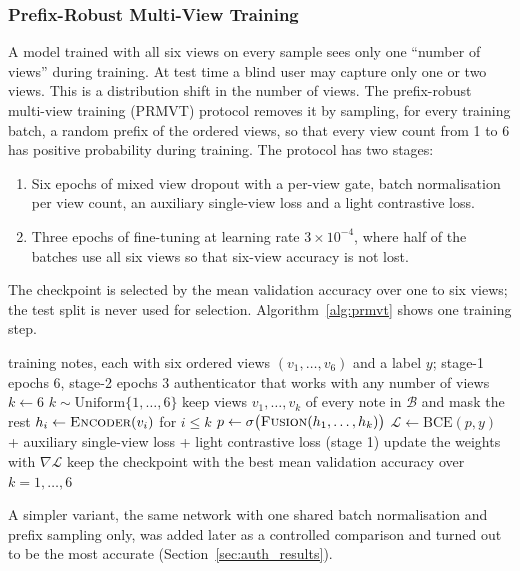 \subsubsection*{Prefix-Robust Multi-View Training}
A model trained with all six views on every sample sees only one ``number of views'' during training. At test time a blind user may capture only one or two views. This is a distribution shift in the number of views. The prefix-robust multi-view training (PRMVT) protocol removes it by sampling, for every training batch, a random prefix of the ordered views, so that every view count from 1 to 6 has positive probability during training. The protocol has two stages:
\begin{enumerate}[noitemsep]
    \item Six epochs of mixed view dropout with a per-view gate, batch normalisation per view count, an auxiliary single-view loss and a light contrastive loss.
    \item Three epochs of fine-tuning at learning rate $3\times10^{-4}$, where half of the batches use all six views so that six-view accuracy is not lost.
\end{enumerate}
The checkpoint is selected by the mean validation accuracy over one to six views; the test split is never used for selection. Algorithm~\ref{alg:prmvt} shows one training step.

\begin{algorithm}[!htbp]
\caption{Prefix-robust multi-view training (PRMVT)}
\label{alg:prmvt}
\begin{algorithmic}[1]
\Require training notes, each with six ordered views $(v_1,\dots,v_6)$ and a label $y$; stage-1 epochs $6$, stage-2 epochs $3$
\Ensure authenticator that works with any number of views
   \State $k \gets 6$
  \Else \State $k \sim \mathrm{Uniform}\{1,\dots,6\}$ 
  \EndIf
  \State keep views $v_1,\dots,v_k$ of every note in $\mathcal{B}$ and mask the rest
  \State $h_i \gets \textsc{Encoder}(v_i)$ for $i \le k$ 
  \State $p \gets \sigma\big(\textsc{Fusion}(h_1,\dots,h_k)\big)$ 
  \State $\mathcal{L} \gets \mathrm{BCE}(p, y)$ + auxiliary single-view loss + light contrastive loss (stage 1)
  \State update the weights with $\nabla \mathcal{L}$
\EndFor
\State keep the checkpoint with the best mean validation accuracy over $k = 1,\dots,6$
\end{algorithmic}
\end{algorithm} A simpler variant, the same network with one shared batch normalisation and prefix sampling only, was added later as a controlled comparison and turned out to be the most accurate (Section~\ref{sec:auth_results}).

